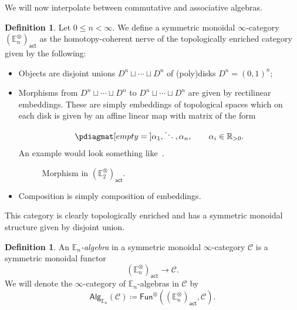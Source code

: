 \documentclass[10pt, oneside]{memoir}
\theoremstyle{definition}
\newtheorem{defn}[thm]{Definition}
\theoremstyle{remark}
\theoremstyle{plain}
\theoremstyle{definition}
\theoremstyle{remark}
\newcommand{\R}{\mathbb{R}}
\newcommand{\E}{\mathbb{E}}
\newcommand{\mc}[1]{\mathcal{#1}}
\newcommand{\ms}[1]{\mathsf{#1}}
\newcommand{\1}{\mathbf{1}}
\newcommand{\2}{\mathbf{2}}
\newcommand{\3}{\mathbf{3}}
\begin{document}
We will now interpolate between commutative and associative algebras.
\begin{defn}
    Let \(0 \leq n < \infty \). We define a symmetric monoidal \(\infty \)-category \((\E_n^{\otimes})_{\ms{act}} \) as the homotopy-coherent nerve of the topologically enriched category given by the following:
    \begin{itemize}
        \item Objects are disjoint unions \(D^n \sqcup \cdots \sqcup D^n \) of (poly)disks \(D^n = (0,1)^n \);
        \item Morphisms from \(D^n \sqcup \cdots \sqcup D^n \) to \(D^n \sqcup \cdots \sqcup D^n \) are given by rectilinear embeddings. These are simply embeddings of topological spaces which on each disk is given by an affine linear map with matrix of the form
        \[ \pdiagmat[empty={}]{\alpha_1,\ddots,\alpha_n}, \qquad \alpha_i \in \R_{>0}. \]
        An example would look something like~.
        \begin{figure}[htpb]
        \begin{center}
        \end{center}
        \caption{Morphism in \((\E_2^{\otimes})_{\ms{act}} \).}%
        \label{fig:E2operad}
        \end{figure}
        \item Composition is simply composition of embeddings.
    \end{itemize}
    This category is clearly topologically enriched and has a symmetric monoidal structure given by disjoint union.
\end{defn}

\begin{defn}
    An \textit{\(\E_n \)-algebra} in a symmetric monoidal \(\infty \)-category \(\mc{C} \) is a symmetric monoidal functor
    \[ (\E_n^{\otimes})_{\ms{act}} \to \mc{C}. \]
    We will denote the \(\infty \)-category of \(\E_n \)-algebras in \(\mc{C} \) by
    \[ \ms{Alg}_{\E_n}(\mc{C}) \coloneqq \ms{Fun}^{\otimes} ((\E_n^{\otimes})_{\ms{act}}, \mc{C}). \]
\end{defn}
\end{document}
